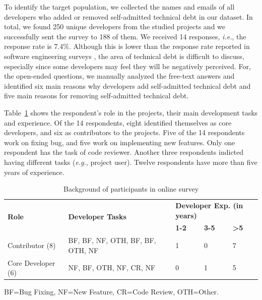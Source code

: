 To identify the target population, we collected the names and emails of all developers who added or removed self-admitted technical debt in our dataset. In total, we found 250 unique developers from the studied projects and we successfully sent the survey to 188 of them.  We received 14 responses, \emph{i.e.}, the response rate is 7.4\%. Although this is lower than the response rate reported in software engineering surveys , the area of technical debt is difficult to discuss, especially since some developers may feel they will be negatively perceived. For, the open-ended questions, we manually analyzed the free-text answers and identified six main reasons why developers add self-admitted technical debt and five main reasons for removing self-admitted technical debt.

Table~\ref{survey_responses} shows the respondent's role in the projects, their main development tasks and experience. Of the 14 respondents, eight identified themselves as core developers, and six as contributors to the projects. Five of the 14 respondents work on fixing bug, and five work on implementing new features. Only one respondent has the task of code reviewer. Another three respondents indicted having different tasks (\emph{e.g.}, project user). Twelve respondents have more than five years of experience.



\begin{table}[t]
	\centering
	\caption{Background of participants in online survey}
	\label{survey_responses}
	\begin{tabular}{l|p{1.2in}|l|l|l}
		\toprule
		\multirow{2}{*}{\textbf{Role}} & \multirow{2}{*}{\textbf{Developer Tasks}} & \multicolumn{3}{p{.8in}}{\textbf{Developer Exp. (in years)}} \\ \cline{3-5} 
		&  & \textbf{1-2} & \textbf{3-5} & \textbf{\textgreater5} \\ \hline
		Contributor (8)& BF, BF, NF, OTH, BF, BF, OTH, NF & 1 & 0 & 7 \\
		Core Developer (6) & NF, BF, OTH, NF, CR, NF & 0 & 1 & 5 \\ \bottomrule
			
			
	\end{tabular}
	
	BF=Bug Fixing, NF=New Feature, CR=Code Review, OTH=Other.
\end{table}


